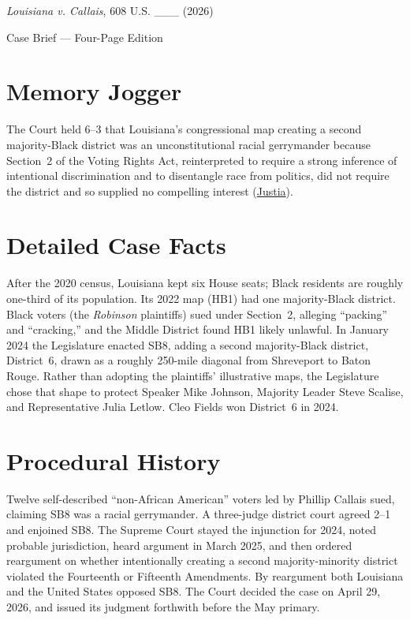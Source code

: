 \documentclass[12pt]{article}
\begin{document}
\begin{center}
{\LARGE \textit{Louisiana v. Callais}, 608 U.S. \_\_\_ (2026)\par}
\vspace{0.8em}
{\large Case Brief --- Four-Page Edition\par}
\end{center}
\vspace{1em}

\section{Memory Jogger}

The Court held 6--3 that Louisiana's congressional map creating a second majority-Black district was an unconstitutional racial gerrymander because Section~2 of the Voting Rights Act, reinterpreted to require a strong inference of intentional discrimination and to disentangle race from politics, did not require the district and so supplied no compelling interest (\href{https://supreme.justia.com/cases/federal/us/608/24-109/}{Justia}).

\section{Detailed Case Facts}

After the 2020 census, Louisiana kept six House seats; Black residents are roughly one-third of its population. Its 2022 map (HB1) had one majority-Black district. Black voters (the \textit{Robinson} plaintiffs) sued under Section~2, alleging ``packing'' and ``cracking,'' and the Middle District found HB1 likely unlawful. In January 2024 the Legislature enacted SB8, adding a second majority-Black district, District~6, drawn as a roughly 250-mile diagonal from Shreveport to Baton Rouge. Rather than adopting the plaintiffs' illustrative maps, the Legislature chose that shape to protect Speaker Mike Johnson, Majority Leader Steve Scalise, and Representative Julia Letlow. Cleo Fields won District~6 in 2024.

\section{Procedural History}

Twelve self-described ``non-African American'' voters led by Phillip Callais sued, claiming SB8 was a racial gerrymander. A three-judge district court agreed 2--1 and enjoined SB8. The Supreme Court stayed the injunction for 2024, noted probable jurisdiction, heard argument in March 2025, and then ordered reargument on whether intentionally creating a second majority-minority district violated the Fourteenth or Fifteenth Amendments. By reargument both Louisiana and the United States opposed SB8. The Court decided the case on April 29, 2026, and issued its judgment forthwith before the May primary.
\end{document}
